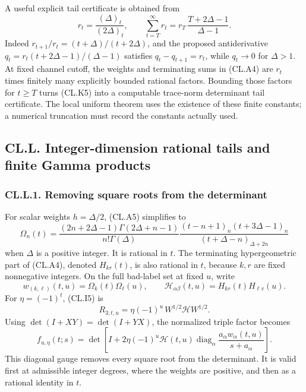 A useful explicit tail certificate is obtained from \[
r_t=\frac{(\Delta)_t}{(2\Delta)_t},\qquad
\sum_{t=T}^{\infty}r_t
=r_T\,\frac{T+2\Delta-1}{\Delta-1}.
\tag{CL.K5}
\] Indeed \(r_{t+1}/r_t=(t+\Delta)/(t+2\Delta)\), and the proposed antiderivative \(q_t=r_t(t+2\Delta-1)/(\Delta-1)\) satisfies \(q_t-q_{t+1}=r_t\), while \(q_t\to0\) for \(\Delta>1\). At fixed channel cutoff, the weights and terminating sums in (CL.A4) are \(r_t\) times finitely many explicitly bounded rational factors. Bounding those factors for \(t\geq T\) turns (CL.K5) into a computable trace-norm determinant tail certificate. The local uniform theorem uses the existence of these finite constants; a numerical truncation must record the constants actually used.

\hypertarget{cl.l.-integer-dimension-rational-tails-and-finite-gamma-products}{%
\subsection{CL.L. Integer-dimension rational tails and finite Gamma products}\label{cl.l.-integer-dimension-rational-tails-and-finite-gamma-products}}

\hypertarget{cl.l.1.-removing-square-roots-from-the-determinant}{%
\subsubsection{CL.L.1. Removing square roots from the determinant}\label{cl.l.1.-removing-square-roots-from-the-determinant}}

For scalar weights \(h=\Delta/2\), (CL.A5) simplifies to \[
\Omega_n(t)=
\frac{(2n+2\Delta-1)\Gamma(2\Delta+n-1)}{n!\Gamma(\Delta)}
\frac{(t-n+1)_n(t+3\Delta-1)_n}
{(t+\Delta-n)_{\Delta+2n}}
\tag{CL.L1}
\] when \(\Delta\) is a positive integer. It is rational in \(t\). The terminating hypergeometric part of (CL.A4), denoted \(H_{kr}(t)\), is also rational in \(t\), because \(k,r\) are fixed nonnegative integers. On the full bad-label set at fixed \(u\), write \[
w_{(k,\ell)}(t,u)=\Omega_k(t)\Omega_\ell(u),\qquad
\mathcal H_{\alpha\beta}(t,u)=H_{kr}(t)H_{\ell v}(u).
\] For \(\eta=(-1)^t\), (CL.I5) is \[
R_{3;t,u}=\eta(-1)^u\,W^{1/2}\mathcal H W^{1/2}.
\] Using \(\det(I+XY)=\det(I+YX)\), the normalized triple factor becomes \[
f_{u,\eta}(t;s)=
\det\!\left[
I+2\eta(-1)^u\mathcal H(t,u)
\operatorname{diag}_\alpha
\frac{a_\alpha w_\alpha(t,u)}{s+a_\alpha}
\right].
\tag{CL.L2}
\] This diagonal gauge removes every square root from the determinant. It is valid first at admissible integer degrees, where the weights are positive, and then as a rational identity in \(t\).

